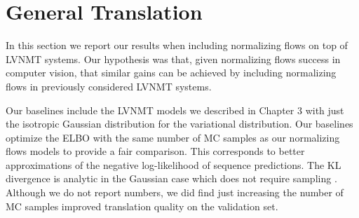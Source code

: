 

\section{General Translation}

In this section we report our results when including normalizing flows on top of \ac{LVNMT} systems. Our hypothesis was that, given normalizing flows success in computer vision, that similar gains can be achieved by including normalizing flows in previously considered \ac{LVNMT} systems.  

Our baselines include the \ac{LVNMT} models we described in Chapter 3 with just the isotropic Gaussian distribution for the variational distribution. Our baselines optimize the \ac{ELBO} with the same number of \ac{MC} samples as our normalizing flows models to provide a fair comparison. This corresponds to better approximations of the negative log-likelihood of sequence predictions. The KL divergence is analytic in the Gaussian case which does not require sampling \cite{kingma2014autoencodingVB,rezende2014stochasticBackprop}. Although we do not report numbers, we did find just increasing the number of \ac{MC} samples improved translation quality on the validation set.

